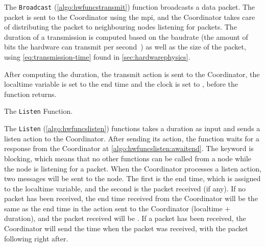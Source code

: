 The \texttt{Broadcast} (\autoref{algo:hwfuncstransmit}) function broadcasts a data packet. The packet is sent to the Coordinator using the \gls{mpi}, and the Coordinator takes care of distributing the packet to neighbouring nodes listening for packets. The duration of a transmission is computed based on the \gls{baudrate} (the amount of bits the hardware can transmit per second~\cite{website:baudrate-mathworks}) as well as the size of the packet, using \autoref{eq:transmission-time} found in \autoref{sec:hardwarephysics}.

After computing the duration, the transmit action is sent to the Coordinator, the localtime variable is set to the end time and the clock is set to \KwNow, before the function returns. \medbreak

\begin{algorithm}[ht]
    \DontPrintSemicolon
    
    
    \caption{The \texttt{Listen} Function.}
    \label{algo:hwfuncslisten}
\end{algorithm}

The \texttt{Listen} (\autoref{algo:hwfuncslisten}) functions takes a duration as input and sends a listen action to the Coordinator. After sending its action, the function waits for a response from the Coordinator at \autoref{algo:hwfuncslisten:awaitend}. The \KwAwait keyword is blocking, which means that no other functions can be called from a node while the node is listening for a packet. When the Coordinator processes a listen action, two messages will be sent to the node. The first is the end time, which is assigned to the localtime variable, and the second is the packet received (if any). If no packet has been received, the end time received from the Coordinator will be the same as the end time in the action sent to the Coordinator (localtime $+$ duration), and the packet received will be \KwNull. If a packet has been received, the Coordinator will send the time when the packet was received, with the packet following right after.

